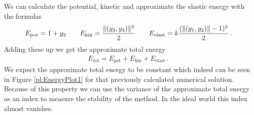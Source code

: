 \documentclass{report}
\DeclarePairedDelimiter{\norm}{\lVert}{\rVert}
\newcounter{constant}
\begin{document}
We can calculate the potential, kinetic and approximate the elastic energy with the formulas
\begin{align*}
	E_{\text{pot}}=1+y_2
	\qquad E_{\text{kin}}=\frac{\norm{(y_3,y_4)}^2}{2}
	\qquad E_{\text{elast}}=k\frac{(\norm{(y_1,y_2)}-1)^2}{2}\,.
\end{align*}
Adding these up we get the approximate total energy
\begin{align*}
	E_{\text{tot}}=E_{\text{pot}}+E_{\text{kin}}+E_{\text{elast}}\,.
\end{align*}
We expect the approximate total energy to be constant which indeed can be seen in Figure \ref{pl:EnergyPlot1} for that previously calculated numerical solution.
Because of this property we can use the variance of the approximate total energy as an index to measure the stability of the method. 
In the ideal world this index almost vanishes.
\end{document}
